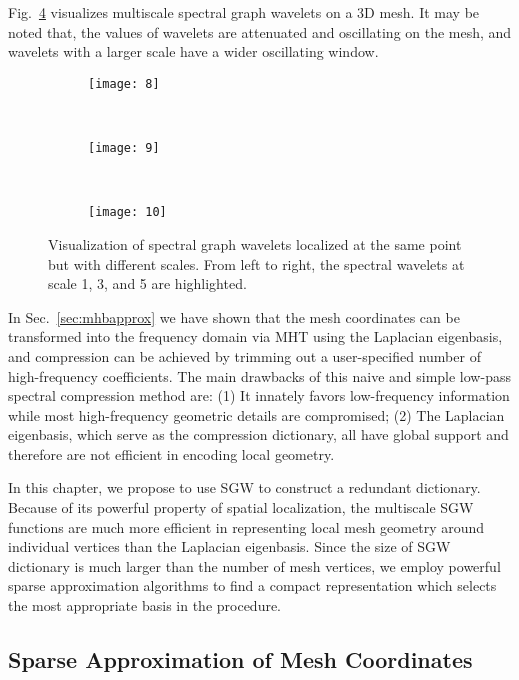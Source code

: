 Fig.~\ref{fig:sgw} visualizes multiscale spectral graph wavelets on a
3D mesh. It may be noted that, the values of wavelets are attenuated
and oscillating on the mesh, and wavelets with a larger scale have a
wider oscillating window.
\begin{figure}
\centering
\begin{subfigure}[b]{0.3\linewidth}
    \texttt{[image: 8]}
    \label{fig:sgw1}
\end{subfigure}%
~
\begin{subfigure}[b]{0.3\linewidth}
    \texttt{[image: 9]}
    \label{fig:sgw2}
\end{subfigure}
~
\begin{subfigure}[b]{0.3\linewidth}
    \texttt{[image: 10]}
    \label{fig:sgw3}
\end{subfigure}%
\caption[Visualization of spectral graph wavelets with different scales.]
{Visualization of spectral graph wavelets localized at the
 same point but with different scales. From left to right, the
 spectral wavelets at scale 1, 3, and 5 are highlighted.}
\label{fig:sgw}
\end{figure}

In Sec.~\ref{sec:mhbapprox} we have shown that the mesh coordinates
can be transformed into the frequency domain via MHT using the
Laplacian eigenbasis, and compression can be achieved by trimming out
a user-specified number of high-frequency coefficients. The main
drawbacks of this naive and simple low-pass spectral compression
method are: (1) It innately favors low-frequency information while
most high-frequency geometric details are compromised; (2) The
Laplacian eigenbasis, which serve as the compression dictionary, all
have global support and therefore are not efficient in encoding local
geometry.

In this chapter, we propose to use SGW to construct a redundant
dictionary. Because of its powerful property of spatial localization,
the multiscale SGW functions are much more efficient in representing
local mesh geometry around individual vertices than the Laplacian
eigenbasis. Since the size of SGW dictionary is much larger than the
number of mesh vertices, we employ powerful sparse approximation
algorithms to find a compact representation which selects the most
appropriate basis in the procedure.

\subsection{Sparse Approximation of Mesh Coordinates}

